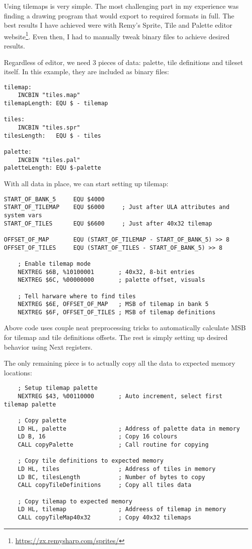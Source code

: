 \documentclass[12pt,twoside,openright,a4paper]{book}
\begin{document}
Using tilemaps is very simple. The most challenging part in my experience was finding a drawing program that would export to required formats in full. The best results I have achieved were with Remy's Sprite, Tile and Palette editor website\footnote{\url{https://zx.remysharp.com/sprites/}}. Even then, I had to manually tweak binary files to achieve desired results.

Regardless of editor, we need 3 pieces of data: palette, tile definitions and tileset itself. In this example, they are included as binary files:

\begin{Verbatim}
tilemap:
	INCBIN "tiles.map"
tilemapLength: EQU $ - tilemap

tiles:
	INCBIN "tiles.spr"
tilesLength:   EQU $ - tiles

palette:
	INCBIN "tiles.pal"
paletteLength: EQU $-palette
\end{Verbatim}

With all data in place, we can start setting up tilemap:

\begin{Verbatim}
START_OF_BANK_5     EQU $4000
START_OF_TILEMAP    EQU $6000     ; Just after ULA attributes and system vars
START_OF_TILES      EQU $6600     ; Just after 40x32 tilemap

OFFSET_OF_MAP       EQU (START_OF_TILEMAP - START_OF_BANK_5) >> 8
OFFSET_OF_TILES     EQU (START_OF_TILES - START_OF_BANK_5) >> 8

	; Enable tilemap mode
	NEXTREG $6B, %10100001       ; 40x32, 8-bit entries
	NEXTREG $6C, %00000000       ; palette offset, visuals

	; Tell harware where to find tiles
	NEXTREG $6E, OFFSET_OF_MAP   ; MSB of tilemap in bank 5
	NEXTREG $6F, OFFSET_OF_TILES ; MSB of tilemap definitions
\end{Verbatim}

Above code uses couple neat preprocessing tricks to automatically calculate MSB for tilemap and tile definitions offsets. The rest is simply setting up desired behavior using Next registers.

The only remaining piece is to actually copy all the data to expected memory locations:

\begin{Verbatim}
	; Setup tilemap palette
	NEXTREG $43, %00110000       ; Auto increment, select first tilemap palette

	; Copy palette
	LD HL, palette               ; Address of palette data in memory
	LD B, 16                     ; Copy 16 colours
	CALL copyPalette             ; Call routine for copying

	; Copy tile definitions to expected memory
	LD HL, tiles                 ; Address of tiles in memory
	LD BC, tilesLength           ; Number of bytes to copy
	CALL copyTileDefinitions     ; Copy all tiles data

	; Copy tilemap to expected memory
	LD HL, tilemap               ; Addreess of tilemap in memory
	CALL copyTileMap40x32        ; Copy 40x32 tilemaps
\end{Verbatim}
\end{document}
